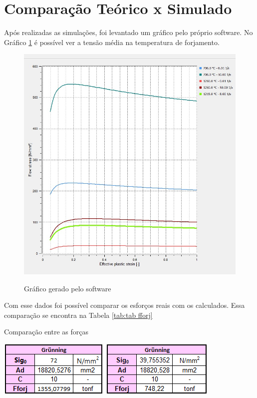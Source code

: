 \documentclass[deposito, acronym, symbols]{fei}
\begin{document}
\newpage

\section{Comparação Teórico x Simulado}

Após realizadas as simulações, foi levantado um gráfico pelo próprio software. No Gráfico \ref{fig:grafico} é possível ver a tensão média na temperatura de forjamento. 



\begin{figure}[!htp]
    \centering
    \caption{Gráfico gerado pelo software}
    \includegraphics[width=1\linewidth]{Imagens/Simufact - Teorico x Simulação.jpg}
    \label{fig:grafico}
\end{figure}

Com esse dados foi possível comparar os esforços reais com os calculados. Essa comparação se encontra na Tabela \ref{tab:tab fforj}

 \begin{table}[!htb]
 \centering
    \caption{Comparação entre as forças}
    \includegraphics[width=0.4\linewidth]{Imagens/comparação fforj.png}
    \label{tab:tab fforj}
 \end{table}
\end{document}
